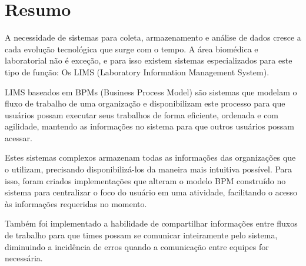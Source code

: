 \section{Resumo}

A necessidade de sistemas para coleta, armazenamento e análise de dados cresce a cada evolução tecnológica que surge com o tempo. A área biomédica e laboratorial não é exceção, e para isso existem sistemas especializados para este tipo de função: Os LIMS (Laboratory Information Management System).

LIMS baseados em BPMs (Business Process Model) são sistemas que modelam o fluxo de trabalho de uma organização e disponibilizam este processo para que usuários possam executar seus trabalhos de forma eficiente, ordenada e com agilidade, mantendo as informações no sistema para que outros usuários possam acessar.

Estes sistemas complexos armazenam todas as informações das organizações que o utilizam, precisando disponibilizá-los da maneira mais intuitiva possível. Para isso, foram criados implementações que alteram o modelo BPM construído no sistema para centralizar o foco do usuário em uma atividade, facilitando o acesso às informações requeridas no momento.

Também foi implementado a habilidade de compartilhar informações entre fluxos de trabalho para que times possam se comunicar inteiramente pelo sistema, diminuindo a incidência de erros quando a comunicação entre equipes for necessária.